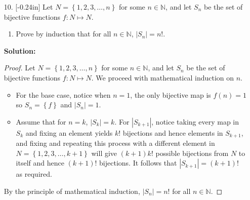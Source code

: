 \documentclass[letterpaper,12pt]{article}
\newcommand{\set}[1]{\left\{ #1 \right\}}
\theoremstyle{definition}
\begin{document}
\begin{enumerate}
    \item[10.] \reversemarginpar{}[-0.24in] 
Let $N= \set{1,2,3,\ldots,n}$ for some $n \in \mathbb{N}$, and let $S_n$ be the set of bijective functions $f: N \mapsto N$. \begin{enumerate}
    \item Prove by induction that for all $n \in \mathbb{N}$, $|S_n|=n!$.
\end{enumerate}
 \begin{mdframed}
            \textbf{Solution:}
            \begin{proof}
               Let $N= \set{1,2,3,\ldots,n}$ for some $n \in \mathbb{N}$, and let $S_n$ be the set of bijective functions $f: N \mapsto N$. We proceed with mathematical induction on $n$. \begin{itemize}
                   \item For the base case, notice when $n = 1$, the only bijective map is $f(n) = 1$ so $S_n = \set{f}$ and $|S_n| = 1$.
                   \item Assume that for $n = k$, $|S_k| = k$. For $|S_{k+1}|$, notice taking every map in $S_k$ and fixing an element yields $k!$ bijections and hence elements in $S_{k+1}$, and fixing and repeating this process with a different element in $N = \set{1,2,3,\ldots,k+1}$ will give $(k+1)k!$ possible bijections from $N$ to itself and hence $(k+1)!$ bijections. It follows that $|S_{k+1} | = (k+1)!$ as required.
               \end{itemize} 
               By the principle of mathematical induction, $|S_n| = n!$ for all $n \in \mathbb{N}$.
            \end{proof}
        \end{mdframed}
\end{enumerate}
\pagebreak
\end{document}
